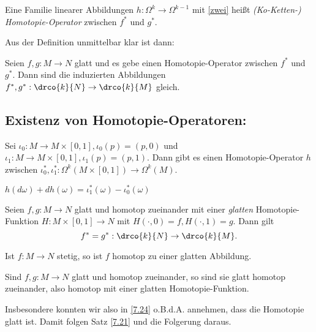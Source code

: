 \begin{defn*} 
	Eine Familie linearer Abbildungen \( h: \Omega^k \to \Omega^{k-1} \) mit \ref{zwei} heißt \emph{(Ko-Ketten-) Homotopie-Operator} zwischen $f^*$ und $g^*$. 
\end{defn*}

\noindent Aus der Definition unmittelbar klar ist dann:

\begin{lem}
	Seien \( f,g: M \to N \) glatt und es gebe einen Homotopie-Operator zwischen $f^*$ und $g^*$. Dann sind die induzierten Abbildungen \( f^*,g^*: \drco{k}{N} \to \drco{k}{M} \) gleich.
\end{lem}

\subsection*{Existenz von Homotopie-Operatoren:}

\begin{lem}
	Sei \( \iota_0: M \to M \times [0,1], \iota_0(p) = (p,0) \) und \( \iota_1: M \to M \times [0,1], \iota_1(p) = (p,1). \) Dann gibt es einen Homotopie-Operator $h$ zwischen $\iota_0^*,\iota_1^*: \Omega^k(M \times [0,1]) \to  \Omega^k(M)$.
\end{lem}

\begin{prop*}
	\( h(d\omega) + d h(\omega) = \iota_1^*(\omega) - \iota_0^*(\omega) \)
\end{prop*}

\begin{lem}\label{7.24}
	Seien \( f,g: M \to N \) glatt und homotop zueinander mit einer \emph{glatten} Homotopie-Funktion \( H: M \times [0,1] \to N \) mit \( H(\cdot,0) = f, H(\cdot,1)=g \). Dann gilt 
	\[ f^*=g^*: \drco{k}{N} \to \drco{k}{M}. \]
\end{lem}

\begin{thm}[Whitney]
	Ist $f: M \to N$ stetig, so ist $f$ homotop zu einer glatten Abbildung.
\end{thm}

\begin{cor*}
	Sind \( f,g: M \to N \) glatt und homotop zueinander, so sind sie glatt homotop zueinander, also homotop mit einer glatten Homotopie-Funktion.
\end{cor*}

Insbesondere konnten wir also in \ref{7.24} o.B.d.A. annehmen, dass die Homotopie glatt ist. Damit folgen Satz \ref{7.21} und die Folgerung daraus.

